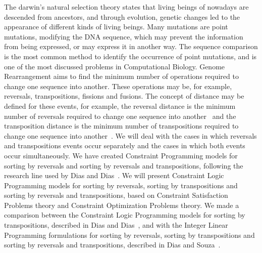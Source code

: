 The darwin's natural selection theory states that living beings of
nowadays are descended from ancestors, and through evolution, genetic
changes led to the appearance of different kinds of living beings. Many
mutations are point mutations, modifying the DNA sequence, which may
prevent the information from being expressed, or may express it in
another way. The sequence comparison is the most common method to
identify the occurrence of point mutations, and is one of the most
discussed problems in Computational Biology. Genome Rearrangement aims
to find the minimum number of operations required to change one sequence
into another. These operations may be, for example, reversals,
transpositions, fissions and fusions. The concept of distance may be
defined for these events, for example, the reversal distance is the
minimum number of reversals required to change one sequence into
another~\cite{BafnaPevzner*1996} and the transposition distance is the
minimum number of transpositions required to change one sequence into
another~\cite{BafnaPevzner*1998}. We will deal with the cases in which
reversals and transpositions events occur separately and the cases in
which both events occur simultaneously. We have created Constraint
Programming models for sorting by reversals and sorting by reversals and
transpositions, following the research line used by Dias and
Dias~\cite{DiasDias*2009}. We will present Constraint Logic Programming
models for sorting by reversals, sorting by transpositions and sorting
by reversals and transpositions, based on Constraint Satisfaction
Problems theory and Constraint Optimization Problems theory. We made a
comparison between the Constraint Logic Programming models for sorting
by transpositions, described in Dias and Dias~\cite{DiasDias*2009}, and
with the Integer Linear Programming formulations for sorting by
reversals, sorting by transpositions and sorting by reversals and
transpositions, described in Dias and Souza~\cite{DiasSouza*2007}.

